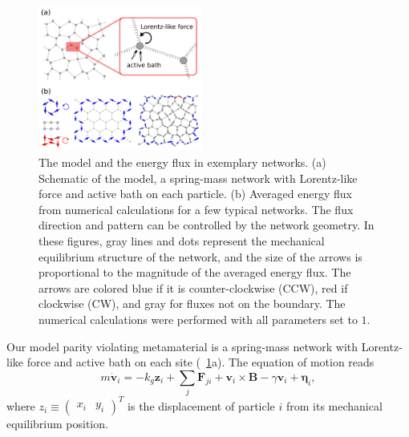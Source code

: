 \documentclass[
 preprint,
 preprintnumbers,
 amsmath,amssymb,
 aps,
 pre,
 longbibliography,
 superscriptaddress,
 10pt, twocolumn
]{revtex4-1}
\begin{document}
\begin{figure}[ht]
	\centering
	\includegraphics[width=0.48\textwidth]{model_and_result.pdf}
    \caption{
    The model and the energy flux in exemplary networks.
    (a) Schematic of the model, a spring-mass network with Lorentz-like force and active bath on each particle.
    (b) Averaged energy flux from numerical calculations for a few typical networks. The flux direction and pattern can be controlled by the network geometry. In these figures, gray lines and dots represent the mechanical equilibrium structure of the network, and the size of the arrows is proportional to the magnitude of the averaged energy flux. The arrows are colored blue if it is counter-clockwise (CCW), red if clockwise (CW), and gray for fluxes not on the boundary. The numerical calculations were performed with all parameters set to $1$.
    }
    \label{fig:model_and_result}
\end{figure}

Our model parity violating metamaterial is a spring-mass network with Lorentz-like force and active bath \cite{Fodor2016HowFar} on each site (\figurename~\ref{fig:model_and_result}a).
The equation of motion reads
\begin{equation} \label{eqn:GLE_single}
    m\dot{\bm{v}}_i = -k_g \bm{z}_i + \sum_j\bm{F}_{ji} + \bm{v}_i\times\bm{B} - \gamma\bm{v}_i + \bm{\eta}_i ,
\end{equation}
where $z_i \equiv \begin{pmatrix} x_i & y_i \end{pmatrix}^T$ is the displacement of particle $i$ from its mechanical equilibrium position.
\end{document}
